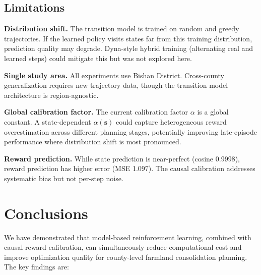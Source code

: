 \documentclass[11pt]{article}
\begin{document}
\subsection{Limitations}

\textbf{Distribution shift.} The transition model is trained on random and greedy trajectories. If the learned policy visits states far from this training distribution, prediction quality may degrade. Dyna-style hybrid training (alternating real and learned steps) could mitigate this but was not explored here.

\textbf{Single study area.} All experiments use Bishan District. Cross-county generalization requires new trajectory data, though the transition model architecture is region-agnostic.

\textbf{Global calibration factor.} The current calibration factor $\alpha$ is a global constant. A state-dependent $\alpha(\mathbf{s})$ could capture heterogeneous reward overestimation across different planning stages, potentially improving late-episode performance where distribution shift is most pronounced.

\textbf{Reward prediction.} While state prediction is near-perfect (cosine 0.9998), reward prediction has higher error (MSE 1.097). The causal calibration addresses systematic bias but not per-step noise.


\section{Conclusions}
\label{sec:conclusions}

We have demonstrated that model-based reinforcement learning, combined with causal reward calibration, can simultaneously reduce computational cost and improve optimization quality for county-level farmland consolidation planning. The key findings are:
\end{document}
